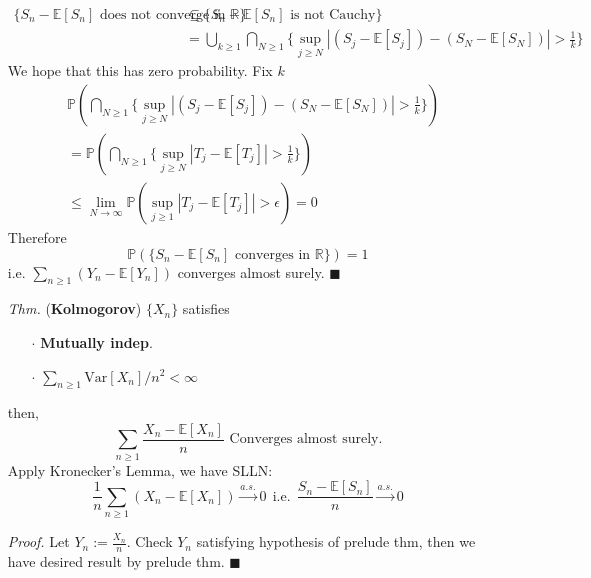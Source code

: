 \documentclass[a4paper,12pt,twoside]{book}
\begin{document}
\begin{itemize}
\begin{equation}
\begin{split}
			\{S_n- \mathbb{E}\left[S_n\right]\text{ does not converge in $\mathbb{R}$}\} 
			&\subseteq \{S_n- \mathbb{E}\left[S_n\right] \text{ is not Cauchy}\}\\
			&=\bigcup_{k\geq 1}\bigcap_{N\geq 1}\{\sup\limits_{j\geq N}|(S_j- \mathbb{E}\left[S_j\right])-(S_N- \mathbb{E}\left[S_N\right])|>\frac{1}{k}\}
		\end{split}
	\end{equation}
	We hope that this has zero probability. Fix $k$
	\begin{equation}
		\begin{split}
			&\mathbb{P}\left(\bigcap_{N\geq 1}\{\sup\limits_{j\geq N}|(S_j- \mathbb{E}\left[S_j\right])-(S_N- \mathbb{E}\left[S_N\right])|>\frac{1}{k}\}\right)\\
			&=\mathbb{P}\left(\bigcap_{N\geq 1}\{\sup\limits_{j\geq N}|T_j- \mathbb{E}\left[T_j\right]|>\frac{1}{k}\}\right)\\
			&\leq\lim\limits_{N\rightarrow\infty}\mathbb{P}\left(\sup\limits_{ j\geq 1}|T_j- \mathbb{E}\left[T_j\right]|>\epsilon\right)=0
		\end{split}
	\end{equation}
	Therefore
	\begin{equation}
		\mathbb{P}\left(\{S_n- \mathbb{E}\left[S_n\right]\text{ converges in $\mathbb{R}$}\}\right)=1
	\end{equation}
	i.e. $\sum_{n\geq 1}(Y_n - \mathbb{E}\left[Y_n\right])$ converges almost surely. $\blacksquare$

	\item[\textit{Thm.}] (\textbf{Kolmogorov}) $\{X_n\}$ satisfies
	\begin{itemize}
		\item[$\cdot$] \textbf{Mutually indep}.
		\item[$\cdot$] $\sum_{n\geq 1}\mathrm{Var}\left[X_n\right]/n^2<\infty$
	\end{itemize}
	then, 
	$$\sum_{n\geq 1}\frac{X_n - \mathbb{E}\left[X_n\right]}{n}\text{  Converges almost surely.}$$
	Apply Kronecker's Lemma, we have SLLN:
	$$\frac{1}{n}\sum_{n\geq 1}(X_n - \mathbb{E}\left[X_n\right]) \xrightarrow{a.s.} 0~~\text{i.e.}~~\frac{S_n - \mathbb{E}\left[S_n\right]}{n}\xrightarrow{a.s.}0$$

	\item[\textit{Proof.}] Let $Y_n:=\frac{X_n}{n}$. Check $Y_n$ satisfying hypothesis of prelude thm, then we have desired result by prelude thm. $\blacksquare$
\end{itemize}
\end{document}
